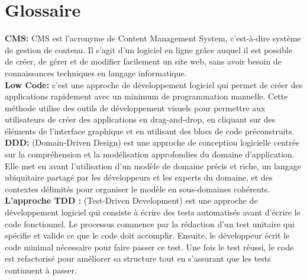 \chapter{Glossaire}
\label{chap:Glossary}


\hspace{\parindent}\textbf{CMS:} CMS est l’acronyme de Content Management System, c’est-à-dire système de gestion de contenu. Il s’agit d’un logiciel en ligne grâce auquel il est possible de créer, de gérer et de modifier facilement un site web, sans avoir besoin de connaissances techniques en langage informatique.\\

\textbf{Low Code:} c'est une approche de développement logiciel qui permet de créer des applications rapidement avec un minimum de programmation manuelle. Cette méthode utilise des outils de développement visuels pour permettre aux utilisateurs de créer des applications en drag-and-drop, en cliquant sur des éléments de l’interface graphique et en utilisant des blocs de code préconstruits.\\

\textbf{DDD:} (Domain-Driven Design) est une approche de conception logicielle centrée sur la compréhension et la modélisation approfondies du domaine d'application. Elle met en avant l'utilisation d'un modèle de domaine précis et riche, un langage ubiquitaire partagé par les développeurs et les experts du domaine, et des contextes délimités pour organiser le modèle en sous-domaines cohérents.\\


\textbf{L'approche TDD :} (Test-Driven Development) est une approche de développement logiciel qui consiste à écrire des tests automatisés avant d'écrire le code fonctionnel. Le processus commence par la rédaction d'un test unitaire qui spécifie et valide ce que le code doit accomplir. Ensuite, le développeur écrit le code minimal nécessaire pour faire passer ce test. Une fois le test réussi, le code est refactorisé pour améliorer sa structure tout en s'assurant que les tests continuent à passer.\\


\pagebreak